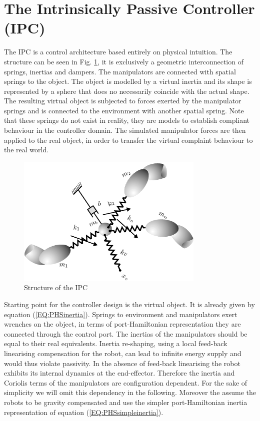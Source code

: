 \documentclass[a4paper,twoside, openright,12pt]{report}
\begin{document}
\section{The Intrinsically Passive Controller (IPC)}
The IPC is a control architecture based entirely on physical intuition. The structure can be seen in Fig. \ref{FIG:IPCsprings}, it is exclusively a geometric interconnection of springs, inertias and dampers. The manipulators are connected with spatial springs to the object. The object is modelled by a virtual inertia and its shape is represented by a sphere that does no necessarily coincide with the actual shape. The resulting virtual object is subjected to forces exerted by the manipulator springs and is connected to the environment with another spatial spring. Note that these springs do not exist in reality, they are models to establish compliant behaviour in the controller domain. The simulated manipulator forces are then applied to the real object, in order to transfer the virtual complaint behaviour to the real world.\\
\begin{figure}
	\centering
	\includegraphics[width=0.8\textwidth]{IPCsprings.png}
	\caption[Structure of the IPC]{Structure of the IPC \cite{Stramigioli_99}}
	\label{FIG:IPCsprings}
\end{figure}
Starting point for the controller design is the virtual object. It is already given by equation (\ref{EQ:PHSinertia}). Springs to environment and manipulators exert wrenches on the object, in terms of port-Hamiltonian representation they are connected through the control port. The inertias of the manipulators should be equal to their real equivalents. Inertia re-shaping, using a local feed-back linearising compensation for the robot, can lead to infinite energy supply \cite{Stramigioli_01} and would thus violate passivity. In the absence of feed-back linearising the robot exhibits its internal dynamics at the end-effector. Therefore the inertia and Coriolis terms of the manipulators are configuration dependent. For the sake of simplicity we will omit this dependency in the following. Moreover the assume the robots to be gravity compensated and use the simpler port-Hamiltonian inertia representation of equation (\ref{EQ:PHSsimpleinertia}).    \\
\end{document}
